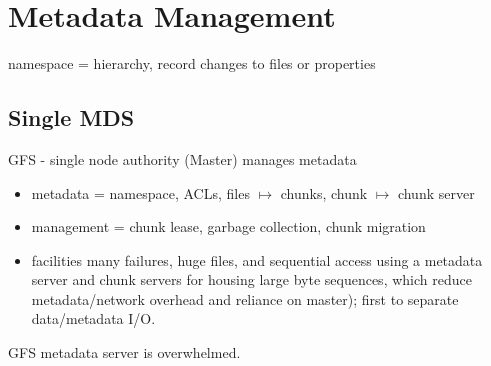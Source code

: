 \documentclass{article}
\begin{document}
%
%
%
%



\section{Metadata Management}
\noindent namespace = hierarchy, record changes to files or properties\\

\subsection{Single MDS}
\noindent\cite{ghemawat:sosp2003-gfs} GFS - single node authority (Master) manages metadata
\begin{itemize}
	\item metadata = namespace, ACLs, files \(\mapsto\) chunks, chunk \(\mapsto\) chunk server
	\item management = chunk lease, garbage collection, chunk migration
	\item facilities many failures, huge files, and sequential access using a metadata server and chunk servers for housing large byte sequences, which reduce metadata/network overhead and reliance on master); first to separate data/metadata I/O.
\end{itemize}

\noindent\cite{mckusick:acm2010-gfs-evolution} GFS metadata server is overwhelmed.\\
\end{document}
